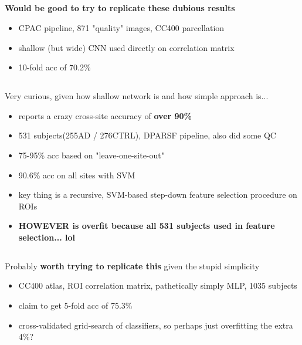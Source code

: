 \documentclass[10pt]{article}
\begin{document}
\subsection{\citet{sherkatghanadAutomatedDetectionAutism2020}}

\textbf{Would be good to try to replicate these dubious results}

\begin{itemize}
  \item CPAC pipeline, 871 "quality" images, CC400 parcellation
  \item shallow (but wide) CNN used directly on correlation matrix
  \item 10-fold acc of 70.2\%
\end{itemize}

\subsection{\citet{wangFunctionalConnectivitybasedClassification2019}}

Very curious, given how shallow network is and how simple approach is...

\begin{itemize}
  \item reports a crazy cross-site accuracy of \textbf{over 90\%}
  \item  531 subjects(255AD / 276CTRL), DPARSF pipeline, also did some QC
  \item 75-95\% acc based on "leave-one-site-out"
  \item 90.6\% acc on all sites with SVM
  \item key thing is a recursive, SVM-based step-down feature selection procedure on ROIs
  \item \textbf{HOWEVER is overfit because all 531 subjects used in feature selection... lol}
\end{itemize}

\subsection{\citet{yangDeepNeuralNetwork2020}}

Probably \textbf{worth trying to replicate this} given the stupid simplicity

\begin{itemize}
  \item CC400 atlas, ROI correlation matrix, pathetically simply MLP, 1035 subjects
  \item claim to get 5-fold acc of 75.3\%
  \item cross-validated grid-search of classifiers, so perhaps just overfitting the extra 4\%?
\end{itemize}
\end{document}
